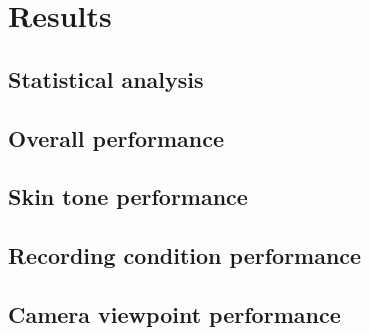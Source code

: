 %
%

\chapter{Results}

\section{Statistical analysis}

\section{Overall performance}

\section{Skin tone performance}

\section{Recording condition performance}

\section{Camera viewpoint performance}


